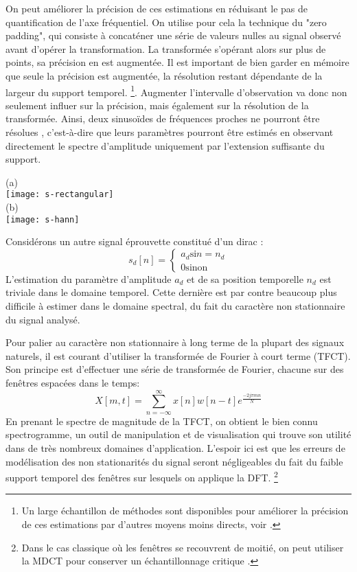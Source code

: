 On peut améliorer la précision de ces estimations en réduisant le pas de quantification de l'axe fréquentiel. On utilise pour cela la technique du "zero padding", qui consiste à concaténer une série de valeurs nulles au signal observé avant d'opérer la transformation. La transformée s'opérant alors sur plus de points, sa précision en est augmentée. Il est important de bien garder en mémoire que seule la précision est augmentée, la résolution restant dépendante de la largeur du support temporel. \footnote{Un large échantillon de méthodes sont disponibles pour améliorer la précision de ces estimations par d'autres moyens moins directs, voir \cite{marchand}.}. Augmenter l'intervalle d'observation va donc non seulement influer sur la précision, mais également sur la résolution de la transformée. Ainsi, deux sinusoïdes de fréquences proches ne pourront être \og résolues \fg, c'est-à-dire que leurs paramètres pourront être estimés en observant directement le spectre d'amplitude uniquement par l'extension suffisante du support.

\begin{marginfigure}
  \label{fig:hanning}
  \begin{center}
  (a) \\
  \texttt{[image: s-rectangular]} \\
  (b) \\
  \texttt{[image: s-hann]}
\end{center}
  \caption{}
\end{marginfigure}

Considérons un autre signal \og éprouvette \fg constitué d'un dirac :
\begin{equation}
  s_d[n] = \begin{cases}
    a_d \text{si} n=n_d \\
    0 \text{sinon}
\end{cases}
\end{equation}
L'estimation du paramètre d'amplitude $a_d$ et de sa position temporelle $n_d$ est triviale dans le domaine temporel. Cette dernière est par contre beaucoup plus difficile à estimer dans le domaine spectral, du fait du caractère non stationnaire du signal analysé.

Pour palier au caractère non stationnaire à long terme de la plupart des signaux naturels, il est courant d'utiliser la transformée de Fourier à court terme (TFCT). Son principe est d'effectuer une série de transformée de Fourier, chacune sur des fenêtres espacées dans le temps:
\begin{equation}
X[m, t] = \sum_{n = - \infty}^{\infty} x[n] w[n-t] e^{\frac{-2 j  \pi m n}{N}}
\end{equation}
En prenant le spectre de magnitude de la TFCT, on obtient le bien connu spectrogramme, un outil de manipulation et de visualisation qui trouve son utilité dans de très nombreux domaines d'application. L'espoir ici est que les erreurs de modélisation des non stationarités du signal seront négligeables du fait du faible support temporel des fenêtres sur lesquels on applique la DFT. \footnote{Dans le cas classique où les fenêtres se recouvrent de moitié, on peut utiliser la MDCT pour conserver un échantillonnage critique \cite{princen1986analysis}.}

